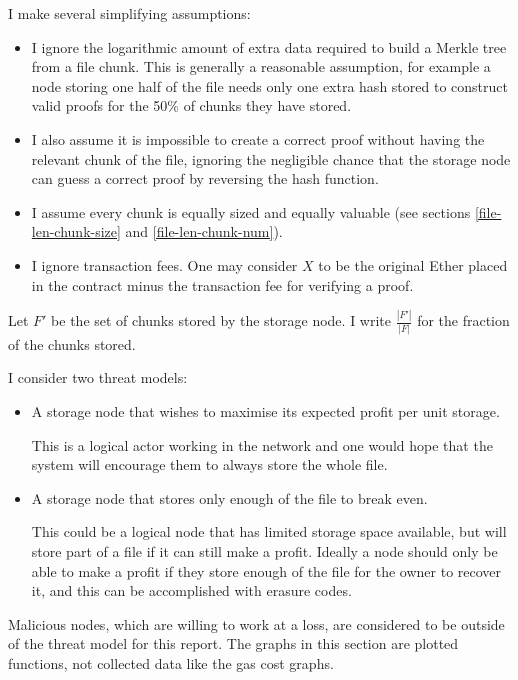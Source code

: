 \documentclass[12pt,a4paper,twoside,openright]{report}
\begin{document}
I make several simplifying assumptions:
\begin{itemize}
\item I ignore the logarithmic amount of extra data required to build a Merkle tree from a file chunk.
This is generally a reasonable assumption, for example a node storing one half of the file needs only one extra hash stored to
construct valid proofs for the 50\% of chunks they have stored.

\item I also assume it is impossible to create a correct proof without having the relevant chunk of the file,
ignoring the negligible chance that the storage node can guess a correct proof by reversing the hash function.

\item I assume every chunk is equally sized and equally valuable (see sections \ref{file-len-chunk-size} and \ref{file-len-chunk-num}).

\item I ignore transaction fees. One may consider $X$ to be the original Ether placed in the contract minus the transaction fee for verifying a proof.
\end{itemize}


Let $F'$ be the set of chunks stored by the storage node. I write $\frac{|F'|}{|F|}$ for the fraction of the chunks stored.

I consider two threat models:
\begin{itemize}
\item A storage node that wishes to maximise its expected profit per unit storage.

This is a logical actor working in the network and one would hope that the system will encourage them to always store the whole file.

\item A storage node that stores only enough of the file to break even.

This could be a logical node that has limited storage space available, but will store part of a file if it can still make a profit.
Ideally a node should only be able to make a profit if they store enough of the file for the owner to recover it, and this can be accomplished with erasure codes.
\end{itemize}

Malicious nodes, which are willing to work at a loss, are considered to be outside of the threat model for this report.
The graphs in this section are plotted functions, not collected data like the gas cost graphs.
\end{document}

